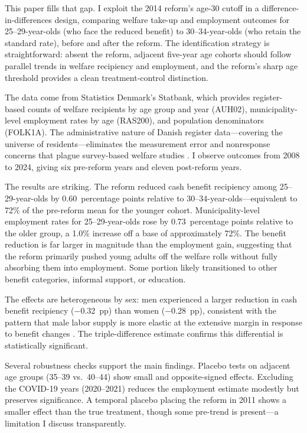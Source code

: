\documentclass[12pt]{article}
\begin{document}
This paper fills that gap. I exploit the 2014 reform's age-30 cutoff in a difference-in-differences design, comparing welfare take-up and employment outcomes for 25--29-year-olds (who face the reduced benefit) to 30--34-year-olds (who retain the standard rate), before and after the reform. The identification strategy is straightforward: absent the reform, adjacent five-year age cohorts should follow parallel trends in welfare recipiency and employment, and the reform's sharp age threshold provides a clean treatment-control distinction.

The data come from Statistics Denmark's Statbank, which provides register-based counts of welfare recipients by age group and year (AUH02), municipality-level employment rates by age (RAS200), and population denominators (FOLK1A). The administrative nature of Danish register data---covering the universe of residents---eliminates the measurement error and nonresponse concerns that plague survey-based welfare studies \citep{meyer2015}. I observe outcomes from 2008 to 2024, giving six pre-reform years and eleven post-reform years.

The results are striking. The reform reduced cash benefit recipiency among 25--29-year-olds by 0.60~percentage points relative to 30--34-year-olds---equivalent to 72\% of the pre-reform mean for the younger cohort. Municipality-level employment rates for 25--29-year-olds rose by 0.73~percentage points relative to the older group, a 1.0\% increase off a base of approximately 72\%. The benefit reduction is far larger in magnitude than the employment gain, suggesting that the reform primarily pushed young adults off the welfare rolls without fully absorbing them into employment. Some portion likely transitioned to other benefit categories, informal support, or education.

The effects are heterogeneous by sex: men experienced a larger reduction in cash benefit recipiency ($-$0.32~pp) than women ($-$0.28~pp), consistent with the pattern that male labor supply is more elastic at the extensive margin in response to benefit changes \citep{chetty2013,kleven2014}. The triple-difference estimate confirms this differential is statistically significant.

Several robustness checks support the main findings. Placebo tests on adjacent age groups (35--39 vs.\ 40--44) show small and opposite-signed effects. Excluding the COVID-19 years (2020--2021) reduces the employment estimate modestly but preserves significance. A temporal placebo placing the reform in 2011 shows a smaller effect than the true treatment, though some pre-trend is present---a limitation I discuss transparently.
\end{document}
